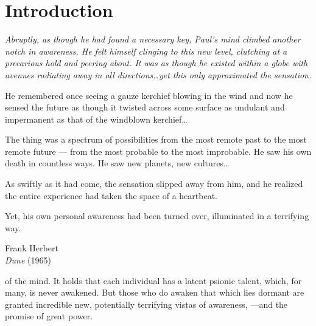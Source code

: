



\frontmatter
\maketitle
\tableofcontents

\mainmatter%

\chapter{Introduction}


\epigraph{\itshape
  Abruptly, as though he had found a necessary key,
  Paul's mind climbed another notch in awareness.
  He felt himself clinging to this new level,
  clutching at a precarious hold and peering about.
  It was as though he existed within a globe with
  avenues radiating away in all directions\ldots yet this only
  approximated the sensation.
  
  \vspace{2mm}He remembered once seeing a gauze kerchief blowing in
  the wind and now he sensed the future as though it twisted
  across some surface as undulant and impermanent as that of
  the windblown kerchief\ldots
  
  \vspace{2mm}The thing was a spectrum of possibilities from the most
  remote past to the most remote future --- from the most
  probable to the most improbable. He saw his own death in
  countless ways. He saw new planets, new cultures\ldots
  
  \vspace{2mm}As swiftly as it had come, the sensation slipped away from
  him, and he realized the entire experience had taken the space
  of a heartbeat.
  
  \vspace{2mm}Yet, his own personal awareness had been turned over,
  illuminated in a terrifying way.\normalfont}
  {Frank Herbert\\\textit{Dune} (1965)}

of the mind.
It holds that each individual has a latent psionic talent,
which, for many,
is never awakened.
But those who do awaken that which lies dormant
are granted incredible new, potentially terrifying vistas of awareness,
---and the promise of great power.

